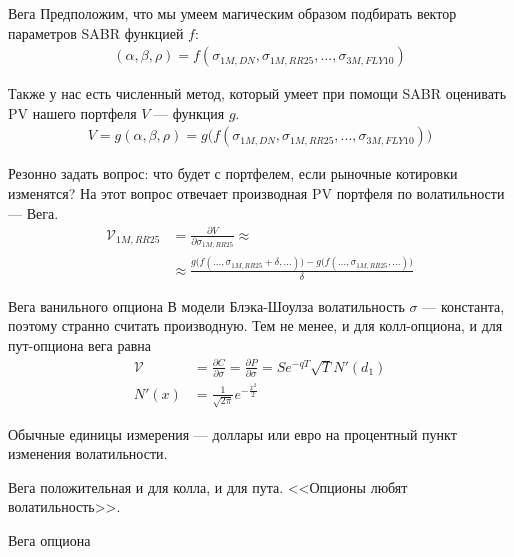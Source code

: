 \documentclass{beamer}
\begin{document}
\begin{frame}{Вега}
\justify
Предположим, что мы умеем магическим образом подбирать вектор параметров SABR функцией $f$:
\begin{align*}
(\alpha, \beta, \rho) = f(\sigma_{1M,DN}, \sigma_{1M,RR25}, ..., \sigma_{3M,FLY10})
\end{align*}

\justify
Также у нас есть численный метод, который умеет при помощи SABR оценивать PV нашего портфеля $V$ --- функция $g$.
\begin{align*}
V = g(\alpha, \beta, \rho) = g\Big(f(\sigma_{1M,DN}, \sigma_{1M,RR25}, ..., \sigma_{3M,FLY10})\Big)
\end{align*}

\justify
Резонно задать вопрос: что будет с портфелем, если рыночные котировки изменятся? На этот вопрос отвечает производная PV портфеля по волатильности --- \alert{Вега}.
\begin{align*}
\mathcal{V}_{1M,RR25} &= \frac{\partial V}{\partial \sigma_{1M,RR25}} \approx \\
&\approx \frac{g\Big(f(...,\sigma_{1M,RR25}+\delta,...)\Big) - g\Big(f(...,\sigma_{1M,RR25},...)\Big)}{\delta}
\end{align*}
\end{frame}



\begin{frame}{Вега ванильного опциона}
\justify
В модели Блэка-Шоулза волатильность $\sigma$ --- константа, поэтому странно считать производную. Тем не менее, и для колл-опциона, и для пут-опциона вега равна
\begin{align*}
\mathcal{V} &= \frac{\partial C}{\partial \sigma} = \frac{\partial P}{\partial \sigma} = Se^{-qT}\sqrt{T}N'(d_1) \\
N'(x) &= \frac{1}{\sqrt{2\pi}}e^{-\frac{x^2}{2}}
\end{align*}

\justify
Обычные единицы измерения --- доллары или евро на процентный пункт изменения волатильности.

\justify
Вега положительная и для колла, и для пута. <<Опционы любят волатильность>>.
\end{frame}



\begin{frame}{Вега опциона}
\centering
{}
\end{frame}
\end{document}
